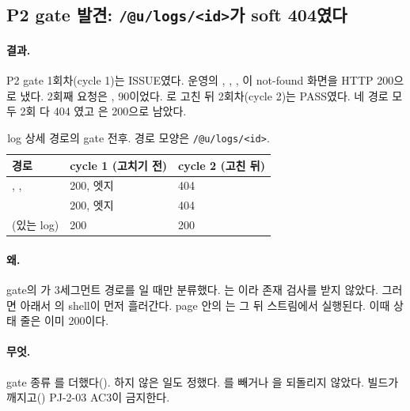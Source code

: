 \subsection{P2 gate 발견: \texttt{/@u/logs/<id>}가 soft 404였다}\label{sec:cc3-p2gate}

\paragraph{결과.}
P2 gate 1회차(cycle 1)는 ISSUE였다. 운영의 , , , 이 not-found 화면을 HTTP 200으로 냈다. 2회째 요청은 ,  90이었다.
로 고친 뒤 2회차(cycle 2)는 PASS였다. 네 경로 모두 2회 다 404 였고 은 200으로 남았다.

\begin{table}[H]
  \caption{log 상세 경로의 gate 전후. 경로 모양은 \texttt{/@u/logs/<id>}.}
  \label{tab:cc3-p2gate}
  \centering\small
  \begin{tabularx}{\linewidth}{@{}Y L{2.8cm} L{2.8cm}@{}}
    \toprule
    경로 & cycle 1 (고치기 전) & cycle 2 (고친 뒤) \\
    \midrule
    , ,  & 200, 엣지  & 404  \\
    \midrule
     & 200, 엣지  & 404  \\
    \midrule
     (있는 log) & 200 & 200 \\
    \bottomrule
  \end{tabularx}
\end{table}

\paragraph{왜.}
gate의 가 3세그먼트 경로를 일 때만 분류했다. 는 이라 존재 검사를 받지 않았다.
그러면  아래서 의 shell이 먼저 흘러간다. page 안의 는 그 뒤 스트림에서 실행된다. 이때 상태 줄은 이미 200이다.

\paragraph{무엇.}
gate 종류 를 더했다(). 하지 않은 일도 정했다.
를 빼거나 을 되돌리지 않았다. 빌드가 깨지고() PJ-2-03 AC3이 금지한다.

